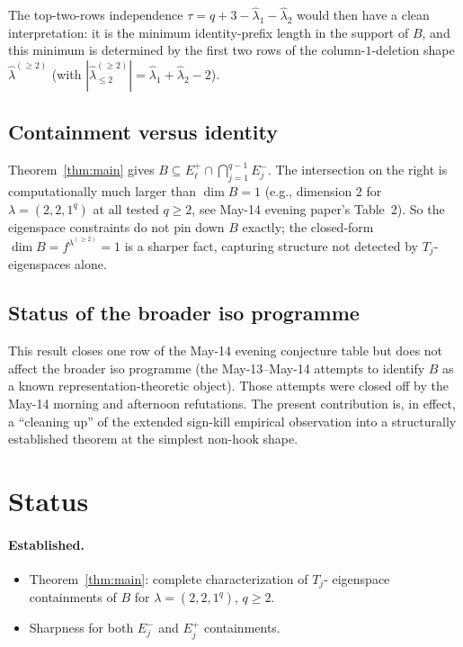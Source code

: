 \documentclass[11pt]{article}
\theoremstyle{definition}
\newcommand{\hatl}{\widehat\lambda}
\begin{document}
The top-two-rows independence $\tau = q + 3 - \hatl_1 - \hatl_2$
would then have a clean interpretation: it is the minimum
identity-prefix length in the support of $B$, and this minimum is
determined by the first two rows of the column-$1$-deletion shape
$\hatl^{(\ge 2)}$ (with $|\hatl^{(\ge 2)}_{\le 2}| = \hatl_1 + \hatl_2 - 2$).

\subsection{Containment versus identity}

Theorem~\ref{thm:main} gives $B \subseteq E_\ell^+ \cap \bigcap_{j=1}^{q-1}
E_j^-$.  The intersection on the right is computationally much larger
than $\dim B = 1$ (e.g., dimension $2$ for $\lambda = (2,2,1^q)$ at all
tested $q \ge 2$, see May-14 evening paper's Table~2).  So the
eigenspace constraints do not pin down $B$ exactly; the closed-form
$\dim B = f^{\lambda^{(\ge 2)}} = 1$ is a sharper fact, capturing structure not
detected by $T_j$-eigenspaces alone.

\subsection{Status of the broader iso programme}

This result closes one row of the May-14 evening conjecture table
but does not affect the broader iso programme (the May-13--May-14
attempts to identify $B$ as a known representation-theoretic
object).  Those attempts were closed off by the May-14 morning and
afternoon refutations.  The present contribution is, in effect, a
``cleaning up'' of the extended sign-kill empirical observation
into a structurally established theorem at the simplest non-hook
shape.

\section{Status}\label{sec:status}

\paragraph{Established.}
\begin{itemize}[topsep=0.3em,itemsep=0.1em]
\item Theorem~\ref{thm:main}: complete characterization of $T_j$-
  eigenspace containments of $B$ for $\lambda = (2,2,1^q)$, $q \ge 2$.
\item Sharpness for both $E_j^-$ and $E_j^+$ containments.
\end{itemize}
\end{document}
